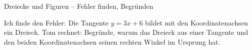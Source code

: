 \begin{aufgabe}{Dreiecke und Figuren – Fehler finden, Begründen}
\begin{teile}
\teil Ich finde den Fehler: Die Tangente $y = 3x + 6$ bildet mit den Koordinatenachsen ein Dreieck. Tom rechnet: 
\teil Begründe, warum das Dreieck aus einer Tangente und den beiden Koordinatenachsen seinen rechten Winkel im Ursprung hat.
\end{teile}
\end{aufgabe}
